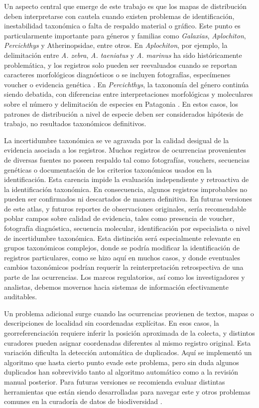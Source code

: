 \documentclass[sn-apa,pdflatex]{sn-jnl}
\begin{document}
Un aspecto central que emerge de este trabajo es que los mapas de
distribución deben interpretarse con cautela cuando existen problemas de
identificación, inestabilidad taxonómica o falta de respaldo material o
gráfico. Este punto es particularmente importante para géneros y
familias como \emph{Galaxias}, \emph{Aplochiton}, \emph{Percichthys} y
Atherinopsidae, entre otros. En \emph{Aplochiton}, por ejemplo, la
delimitación entre \emph{A. zebra}, \emph{A. taeniatus} y \emph{A.
marinus} ha sido históricamente problemática, y los registros solo
pueden ser reevaluados cuando se reportan caracteres morfológicos
diagnósticos o se incluyen fotografías, especímenes voucher o evidencia
genética \citep{Alo2013}. En \emph{Percichthys}, la taxonomía del género
continúa siendo debatida, con diferencias entre interpretaciones
morfológicas y moleculares sobre el número y delimitación de especies en
Patagonia
\citep{Lopez-Arbarello2004, ruzzantePhylogeographyPercichthyidaePisces2006, ruzzantePhylogeographyPhenotypicDiversification2011, Arratia2019}.
En estos casos, los patrones de distribución a nivel de especie deben
ser considerados hipótesis de trabajo, no resultados taxonómicos
definitivos.

La incertidumbre taxonómica se ve agravada por la calidad desigual de la
evidencia asociada a los registros. Muchos registros de ocurrencias
provenientes de diversas fuentes no poseen respaldo tal como
fotografías, vouchers, secuencias genéticas o documentación de los
criterios taxonómicos usados en la identificación. Esta carencia impide
la evaluación independiente y retroactiva de la identificación
taxonómica. En consecuencia, algunos registros improbables no pueden ser
confirmados ni descartados de manera definitiva. En futuras versiones de
este atlas, y futuros reportes de observaciones originales, sería
recomendable poblar campos sobre calidad de evidencia, tales como
presencia de voucher, fotografía diagnóstica, secuencia molecular,
identificación por especialista o nivel de incertidumbre taxonómica.
Esta distinción será especialmente relevante en grupos taxonómicos
complejos, donde se podría modificar la identificación de registros
particulares, como se hizo aquí en muchos casos, y donde eventuales
cambios taxonómicos podrían requerir la reinterpretación retrospectiva
de una parte de las ocurrencias. Los marcos regulatorios, así como los
investigadores y analistas, debemos movernos hacia sistemas de
información efectivamente auditables.

Un problema adicional surge cuando las ocurrencias provienen de textos,
mapas o descripciones de localidad sin coordenadas explícitas. En esos
casos, la georreferenciación requiere inferir la posición aproximada de
la colecta, y distintos curadores pueden asignar coordenadas diferentes
al mismo registro original. Esta variación dificulta la detección
automática de duplicados. Aquí se implementó un algoritmo que hasta
cierto punto evade este problema, pero sin duda algunos duplicados han
sobrevivido tanto al algoritmo automático como a la revisión manual
posterior. Para futuras versiones se recomienda evaluar distintas
herramientas que están siendo desarrolladas para navegar este y otros
problemas comunes en la curadoría de datos de biodiversidad
\citep{Zizka2020}.
\end{document}
